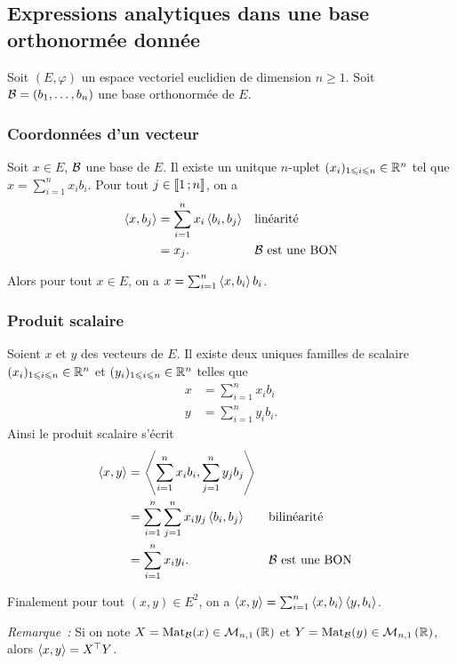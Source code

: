 \subsection{Expressions analytiques dans une base orthonormée donnée}

Soit \((E,\varphi)\) un espace vectoriel euclidien de dimension \(n \geqslant 1\). Soit \(\mathcal{B}=(b_1, \ldots, b_n)\) une base orthonormée de \(E\).

\subsubsection{Coordonnées d'un vecteur}

Soit \(x \in E\), \(\mathcal{B}\) une base de \(E\). Il existe un unitque \(n\)-uplet \((x_i)_{1 \leqslant i \leqslant n}\in\mathbb{R}^n\) tel que \(x = \sum_{i=1}^n x_ib_i\). Pour tout \(j \in \mathopen{\llbracket}1\mathclose{}\mathpunct{};n\mathclose{\rrbracket}\), on a
\begin{align}
  \left\langle{x},{b_j}\right\rangle &=\sum_{i=1}^n x_i\left\langle{b_i},{b_j}\right\rangle && \text{linéarité} \\
  &=x_j. && \mathcal{B} \text{~est une BON}
\end{align}

Alors pour tout \(x \in E\), on a \(x = \sum_{i=1}^n \left\langle{x},{b_i}\right\rangle b_i\).

\subsubsection{Produit scalaire}

Soient \(x\) et \(y\) des vecteurs de \(E\). Il existe deux uniques familles de scalaire \((x_i)_{1 \leqslant i \leqslant n}\in\mathbb{R}^n\) et \((y_i)_{1 \leqslant i \leqslant n}\in\mathbb{R}^n\) telles que
\begin{align}
  x &= \sum_{i=1}^n x_ib_i \\
  y &= \sum_{i=1}^n y_ib_i.
\end{align}
Ainsi le produit scalaire s'écrit
\begin{align}
  \left\langle{x},{y}\right\rangle &=\left\langle{\sum_{i=1}^n x_ib_i},{\sum_{j=1}^n y_jb_j}\right\rangle \\
  &=\sum_{i=1}^n  \sum_{j=1}^n x_i y_j \left\langle{b_i},{b_j}\right\rangle && \text{bilinéarité} \\
  &=\sum_{i=1}^n  x_i y_i. && \mathcal{B} \text{~est une BON}
\end{align}

Finalement pour tout \((x,y) \in E^2\), on a \(\left\langle{x},{y}\right\rangle = \sum_{i=1}^n \left\langle{x},{b_i}\right\rangle\left\langle{y},{b_i}\right\rangle\).

\emph{Remarque~:} Si on note \(X=\mathrm{Mat}_{\mathcal{B}}(x) \in \mathcal{M}_{n,1}\left(\mathbb{R}\right)\) et \(Y=\mathrm{Mat}_{\mathcal{B}}(y) \in \mathcal{M}_{n,1}\left(\mathbb{R}\right)\), alors \(\left\langle{x},{y}\right\rangle = X^{\top}Y\).

